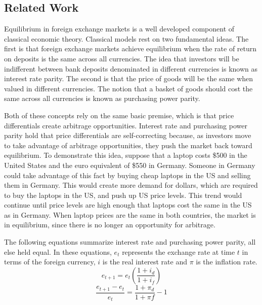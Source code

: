 \documentclass{sig-alternate-05-2015}
\begin{document}
\subsection{Related Work}
Equilibrium in foreign exchange markets is a well developed component of classical economic theory. Classical models rest on two fundamental ideas. The first is that foreign exchange markets achieve equilibrium when the rate of return on deposits is the same across all currencies. The idea that investors will be indifferent between bank deposits denominated in different currencies is known as interest rate parity. The second is that the price of goods will be the same when valued in different currencies. The notion that a basket of goods should cost the same across all currencies is known as purchasing power parity.
\par{} Both of these concepts rely on the same basic premise, which is that price differentials create arbitrage opportunities. Interest rate and purchasing power parity hold that price differentials are self-correcting because, as investors move to take advantage of arbitrage opportunities, they push the market back toward equilibrium. To demonstrate this idea, suppose that a laptop costs \$500 in the United States and the euro equivalent of \$550 in Germany. Someone in Germany could take advantage of this fact by buying cheap laptops in the US and selling them in Germany. This would create more demand for dollars, which are required to buy the laptops in the US, and push up US price levels. This trend would continue until price levels are high enough that laptops cost the same in the US as in Germany. When laptop prices are the same in both countries, the market is in equilibrium, since there is no longer an opportunity for arbitrage.
\par{} The following equations summarize interest rate and purchasing power parity, all else held equal. In these equations, $e_{t}$ represents the exchange rate at time $t$ in terms of the foreign currency, $i$ is the real interest rate and $\pi$ is the inflation rate. 
\begin{equation}
e_{t+1} = e_{t} \left( \frac{1+i_{d}}{1+i_{f}} \right)
\end{equation}
\begin{equation}
\frac{e_{t+1}-e_{t}}{e_{t}} = \frac{1+\pi_{d}}{1+\pi{f}} - 1
\end{equation}
\end{document}

